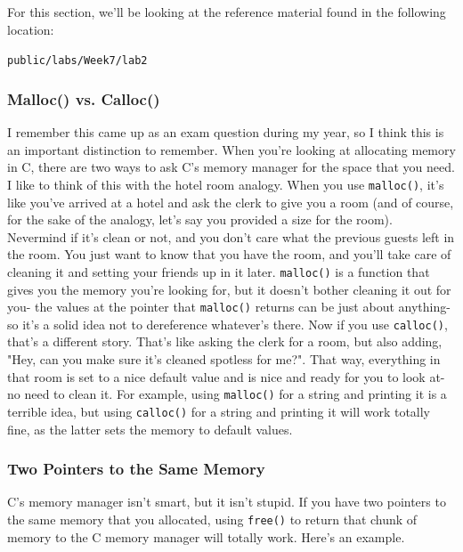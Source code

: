 \documentclass[english, 10pt]{article}
\begin{document}
For this section, we'll be looking at the reference material found in the following location:\newline

\texttt{public/labs/Week7/lab2}

\subsubsection{Malloc() vs. Calloc()}

I remember this came up as an exam question during my year, so I think this is an important distinction to remember. When you're looking at allocating memory in C, there are two ways to ask C's memory manager for the space that you need. I like to think of this with the hotel room analogy. When you use \texttt{malloc()}, it's like you've arrived at a hotel and ask the clerk to give you a room (and of course, for the sake of the analogy, let's say you provided a size for the room). Nevermind if it's clean or not, and you don't care what the previous guests left in the room. You just want to know that you have the room, and you'll take care of cleaning it and setting your friends up in it later. \texttt{malloc()} is a function that gives you the memory you're looking for, but it doesn't bother cleaning it out for you- the values at the pointer that \texttt{malloc()} returns can be just about anything- so it's a solid idea not to dereference whatever's there. Now if you use \texttt{calloc()}, that's a different story. That's like asking the clerk for a room, but also adding, "Hey, can you make sure it's cleaned spotless for me?". That way, everything in that room is set to a nice default value and is nice and ready for you to look at- no need to clean it. For example, using \texttt{malloc()} for a string and printing it is a terrible idea, but using \texttt{calloc()} for a string and printing it will work totally fine, as the latter sets the memory to default values.

\subsubsection{Two Pointers to the Same Memory}

C's memory manager isn't smart, but it isn't stupid. If you have two pointers to the same memory that you allocated, using \texttt{free()} to return that chunk of memory to the C memory manager will totally work. Here's an example.\newline
\end{document}
